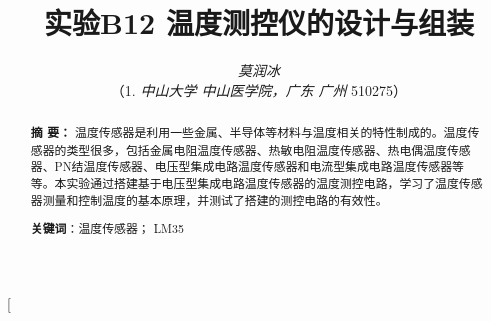 \documentclass[10pt,a4paper,twocolumn,twoside,UTF8]{ctexart}
\begin{document}
\title{\LARGE\textbf{实验B12 温度测控仪的设计与组装}\footnotemark[1]}
\author{\large\textit{莫润冰\footnotemark[2]}
\\ \normalsize{（1. \textit{中山大学 中山医学院，广东 广州 }510275）}}
\date{}%


\twocolumn[
	\begin{@twocolumnfalse}
	\maketitle  %
  	\renewcommand{\abstractname} {} %
	\begin{abstract}
	\vspace{-3em}
	{\bf 摘{} 要：}
	{\small 温度传感器是利用一些金属、半导体等材料与温度相关的特性制成的。温度传感器的类型很多，包括金属电阻温度传感器、热敏电阻温度传感器、热电偶温度传感器、PN结温度传感器、电压型集成电路温度传感器和电流型集成电路温度传感器等等。本实验通过搭建基于电压型集成电路温度传感器的温度测控电路，学习了温度传感器测量和控制温度的基本原理，并测试了搭建的测控电路的有效性。}
	\par%
	\textbf{关键词}：温度传感器； LM35
	\vspace{2em}
	\end{abstract}
	\end{@twocolumnfalse}
\end{document}
